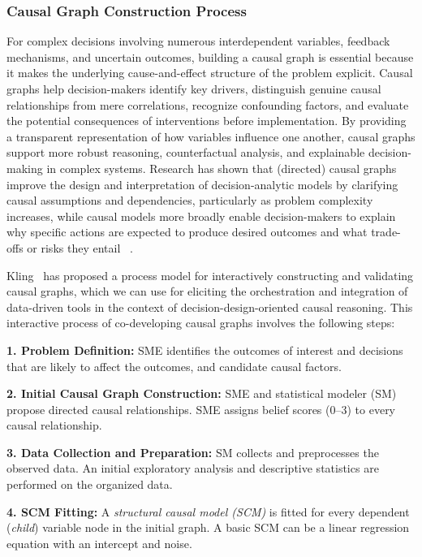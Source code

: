 \documentclass{sfuthesis}
\begin{document}
\subsubsection{Causal Graph Construction Process}
For complex decisions involving numerous interdependent variables, feedback mechanisms, and uncertain outcomes, building a causal graph is essential because it makes the underlying cause-and-effect structure of the problem explicit. Causal graphs help decision-makers identify key drivers, distinguish genuine causal relationships from mere correlations, recognize confounding factors, and evaluate the potential consequences of interventions before implementation. By providing a transparent representation of how variables influence one another, causal graphs support more robust reasoning, counterfactual analysis, and explainable decision-making in complex systems. Research has shown that (directed) causal graphs improve the design and interpretation of decision-analytic models by clarifying causal assumptions and dependencies, particularly as problem complexity increases, while causal models more broadly enable decision-makers to explain why specific actions are expected to produce desired outcomes and what trade-offs or risks they entail ~\cite{cox2021information,dijk2025directed}.\par
Kling~\cite{kling2025co} has proposed a process model for interactively constructing and validating causal graphs, which we can use for eliciting the orchestration and integration of data-driven tools in the context of decision-design-oriented causal reasoning. This interactive process of co-developing causal graphs involves the following steps:\par
\textbf{1. Problem Definition:} SME identifies the outcomes of interest and decisions that are likely to affect the outcomes, and candidate causal factors.\par
\textbf{2. Initial Causal Graph Construction:} SME and statistical modeler (SM) propose directed causal relationships. SME assigns belief scores (0–3) to every causal relationship.\par
\textbf{3. Data Collection and Preparation:} SM collects and preprocesses the observed data. An initial exploratory analysis and descriptive statistics are performed on the organized data.\par
\textbf{4. SCM Fitting:} A \textit{structural causal model (SCM)} is fitted for every dependent (\textit{child}) variable node in the initial graph. A basic SCM can be a linear regression equation with an intercept and noise.\par 
\end{document}
